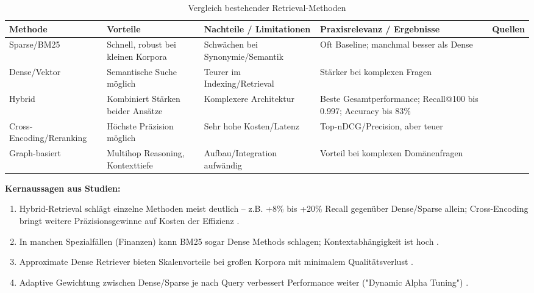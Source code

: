 \begin{table}[h]
\centering
\small
\begin{tabular}{|p{3.3cm}|p{2.5cm}|p{2.7cm}|p{3.5cm}|p{2cm}|}
\hline
\textbf{Methode} & \textbf{Vorteile} & \textbf{Nachteile / Limitationen} & \textbf{Praxisrelevanz / Ergebnisse} & \textbf{Quellen} \\
\hline

Sparse/BM25 
& Schnell, robust bei kleinen Korpora 
& Schwächen bei Synonymie/Semantik 
& Oft Baseline; manchmal besser als Dense 
& \cite{Iyer2025Careful} \cite{Abirami2025Evaluating} \cite{Akarsu2026From} \cite{Mala2025Hybrid}\\
\hline

Dense/Vektor 
& Semantische Suche möglich 
& Teurer im Indexing/Retrieval 
& Stärker bei komplexen Fragen 
&\cite{Iyer2025Careful} \cite{Akarsu2026From} \cite{Abirami2025Evaluating}\\
\hline

Hybrid 
& Kombiniert Stärken beider Ansätze 
& Komplexere Architektur 
& Beste Gesamtperformance; Recall@100 bis 0.997; Accuracy bis 83\% 
& \cite{Abirami2025Evaluating} \cite{Iyer2025Careful} \cite{Abirami2025Evaluating}\\
\hline

Cross-Encoding/Reranking 
& Höchste Präzision möglich 
& Sehr hohe Kosten/Latenz 
& Top-nDCG/Precision, aber teuer 
& \cite{Iyer2025Careful}\\
\hline

Graph-basiert 
& Multihop Reasoning, Kontexttiefe 
& Aufbau/Integration aufwändig 
& Vorteil bei komplexen Domänenfragen 
& \cite{Zhang2025A} \cite{Barron2024Domain-Specific}\\
\hline

\end{tabular}
\caption{Vergleich bestehender Retrieval-Methoden}
\end{table}
\textbf{Kernaussagen aus Studien:}
\begin{enumerate}
    \item Hybrid-Retrieval schlägt einzelne Methoden meist deutlich – z.B. +8\% bis +20\% Recall gegenüber Dense/Sparse allein; Cross-Encoding bringt weitere Präzisionsgewinne auf Kosten der Effizienz\cite{Iyer2025Careful} \cite{Abirami2025Evaluating}.
    \item In manchen Spezialfällen (Finanzen) kann BM25 sogar Dense Methods schlagen; Kontextabhängigkeit ist hoch \cite{Akarsu2026From}.
    \item Approximate Dense Retriever bieten Skalenvorteile bei großen Korpora mit minimalem Qualitätsverlust  \cite{Wang2024Evaluating}.
    \item Adaptive Gewichtung zwischen Dense/Sparse je nach Query verbessert Performance weiter ("Dynamic Alpha Tuning") \cite{Hsu2025DAT}.
\end{enumerate}

